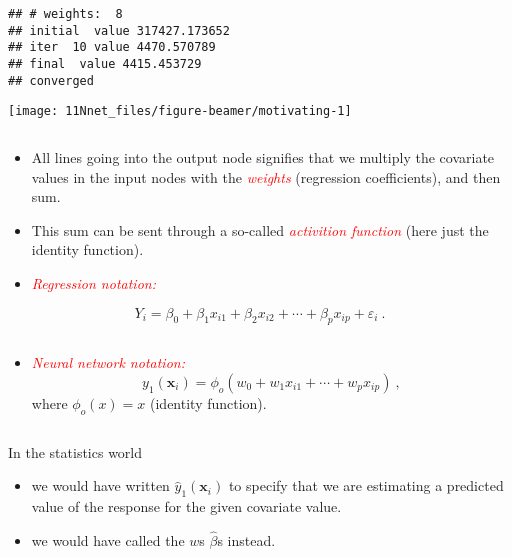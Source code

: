 \documentclass[10pt,ignorenonframetext,]{beamer}
\providecommand{\tightlist}{%
  \setlength{\itemsep}{0pt}\setlength{\parskip}{0pt}}
\begin{document}
\begin{frame}[fragile]

\vspace{-20mm}

\scriptsize

\begin{verbatim}
## # weights:  8
## initial  value 317427.173652 
## iter  10 value 4470.570789
## final  value 4415.453729 
## converged
\end{verbatim}

\begin{center}\texttt{[image: 11Nnet\_files/figure-beamer/motivating-1]} \end{center}

\(~\)

\normalsize

\begin{itemize}
\tightlist
\item
  All lines going into the output node signifies that we multiply the
  covariate values in the input nodes with the
  \emph{\textcolor{red}{weights}} (regression coefficients), and then
  sum.
\item
  This sum can be sent through a so-called
  \emph{\textcolor{red}{activition function}} (here just the identity
  function).
\end{itemize}

\end{frame}

\begin{frame}

\begin{itemize}
\tightlist
\item
  \emph{\textcolor{red}{Regression notation:}}
\end{itemize}

\begin{equation*}
 Y_i=\beta_0 + \beta_1 x_{i1}+\beta_2 x_{i2}+\cdots + \beta_p x_{ip}+\varepsilon_i \ .
\end{equation*}

\(~\)

\begin{itemize}
\tightlist
\item
  \emph{\textcolor{red}{Neural network notation:}} \begin{equation*}
  y_1({\boldsymbol x}_i)=\phi_o(w_0+w_1 x_{i1}+\cdots + w_p x_{ip}) \ ,
  \end{equation*} where \(\phi_o(x)=x\) (identity function).
\end{itemize}

\(~\)

In the statistics world

\begin{itemize}
\item
  we would have written \(\hat{y}_1({\boldsymbol x}_i)\) to specify that
  we are estimating a predicted value of the response for the given
  covariate value.
\item
  we would have called the \(w\)s \(\hat{\beta}\)s instead.
\end{itemize}

\end{frame}
\end{document}
